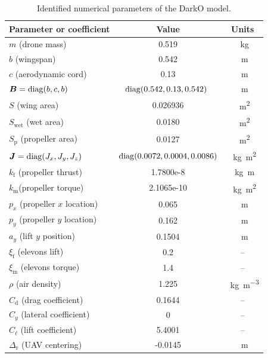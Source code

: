 \begin{table}[ht]
  \centering
    \begin{tabular}{|l|c|c|}
      \hline
      \multicolumn{1}{|c|}{Parameter or coefficient} & Value & Units  \\
      \hline
      $m$ (drone mass)  & 0.519 & \SI{}{\kilogram} \\
      \hline
      $b$ (wingspan)  & 0.542 & \SI{}{\meter} \\
      \hline
      $c$ (aerodynamic cord)  & 0.13 & \SI{}{\meter} \\
      \hline
      $\boldsymbol{B}=\operatorname{diag}(b,c,b)$ & $\!\!\operatorname{diag}(0.542, 0.13, 0.542)$ \!\! & \SI{}{\meter}\\
      \hline
      $S$ (wing area) & 0.026936 & \SI{}{\square\meter}\\
      \hline
      $S_{\text{wet}}$ (wet area) & 0.0180 & \SI{}{\square\meter}\\
      \hline
      $S_{\text{p}}$ (propeller area) & 0.0127 & \SI{}{\square\meter}\\
      \hline
      $\boldsymbol{J}=\operatorname{diag}(J_{x},J_{y},J_{z})$ & \!\! $\operatorname{diag}(0.0072,0.0004,0.0086)$\!\! & \SI{}{\kilogram\square\meter}\\
      \hline
      $k_{\text{f}}$ (propeller thrust) & 1.7800e-8 & \SI{}{\kilogram\meter}\\
      \hline
      $k_{\text{m}}$(propeller torque) & 2.1065e-10 & \SI{}{\kilogram\square\meter}\\
      \hline
      $p_{x}$ (propeller $x$ location) & 0.065 & \SI{}{\meter}\\
      \hline
      $p_{y}$ (propeller $y$ location) & 0.162 & \SI{}{\meter}\\
      \hline
      $a_{y}$ (lift $y$ position) & 0.1504 & \SI{}{\meter}\\
      \hline
      $\xi_{\text{f}}$ (elevons lift) & 0.2 & --\\
      \hline
      $\xi_{\text{m}}$ (elevons torque) & 1.4 & --\\
      \hline
      $\rho$ (air density) & 1.225 & \SI{}{\kilogram\per\cubic\meter}\\
      \hline
      $C_{\text{d}}$ (drag coefficient) & 0.1644 & --\\
      \hline
      $C_{y}$ (lateral coefficient) & 0 & --\\
      \hline
       $C_{\ell}$ (lift coefficient) & 5.4001 & --\\
      \hline
      $\Delta_{\text{r}}$ (UAV centering) & -0.0145 & \SI{}{\meter}\\
      \hline
    \end{tabular}
    \caption{\label{tab:pars} Identified numerical parameters of the DarkO model.}
\end{table}

